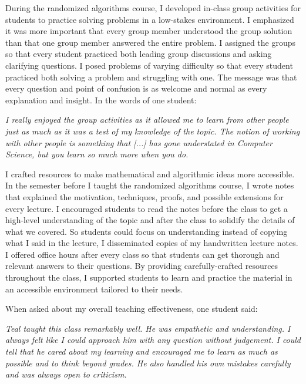 \documentclass[11pt]{article}
\begin{document}
During the randomized algorithms course, I developed in-class group activities for students to practice solving problems in a low-stakes environment.
I emphasized it was more important that every group member understood the group solution than that one group member answered the entire problem.
I assigned the groups so that every student practiced both leading group discussions and asking clarifying questions.
I posed problems of varying difficulty so that every student practiced both solving a problem and struggling with one.
The message was that every question and point of confusion is as welcome and normal as every explanation and insight.
In the words of one student:
\begin{displayquote}
	\textit{I really enjoyed the group activities as it allowed me to learn from other people just as much as it was a test of my knowledge of the topic. The notion of working with other people is something that [...] %
	has gone understated in Computer Science, but you learn so much more when you do.}
\end{displayquote}

I crafted resources to make mathematical and algorithmic ideas more accessible.
In the semester before I taught the randomized algorithms course, I wrote notes that explained the motivation, techniques, proofs, and possible extensions for every lecture.
I encouraged students to read the notes before the class to get a high-level understanding of the topic and after the class to solidify the details of what we covered.
So students could focus on understanding instead of copying what I said in the lecture, I disseminated copies of my handwritten lecture notes.
I offered office hours after every class so that students can get thorough and relevant answers to their questions.
By providing carefully-crafted resources throughout the class, I supported students to learn and practice the material in an accessible environment tailored to their needs.

When asked about my overall teaching effectiveness, one student said:
\begin{displayquote}
	\textit{Teal taught this class remarkably well. He was empathetic and understanding. I always felt like I could approach him with any question without judgement. I could tell that he cared about my learning and encouraged me to learn as much as possible and to think beyond grades. He also handled his own mistakes carefully and was always open to criticism. %
	}
\end{displayquote}
\end{document}
